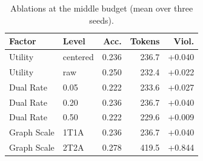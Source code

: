 \begin{table}[t]
\centering
\caption{Ablations at the middle budget (mean over three seeds).}
\label{tab:ablation-results}
\scriptsize
\setlength{\tabcolsep}{3pt}
\begin{tabular}{llrrr}
\hline
Factor & Level & Acc. & Tokens & Viol. \\
\hline
Utility & centered & 0.236 & 236.7 & +0.040 \\
Utility & raw & 0.250 & 232.4 & +0.022 \\
Dual Rate & 0.05 & 0.222 & 233.6 & +0.027 \\
Dual Rate & 0.20 & 0.236 & 236.7 & +0.040 \\
Dual Rate & 0.50 & 0.222 & 229.6 & +0.009 \\
Graph Scale & 1T1A & 0.236 & 236.7 & +0.040 \\
Graph Scale & 2T2A & 0.278 & 419.5 & +0.844 \\
\hline
\end{tabular}
\end{table}
